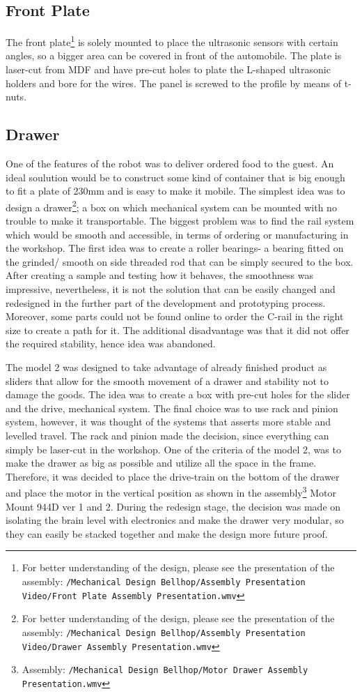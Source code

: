 \documentclass[11pt]{article}
\begin{document}
\subsection*{Front Plate}
The front plate\footnote{For better understanding of the design, please see the presentation of the assembly: \texttt{/Mechanical Design Bellhop/Assembly Presentation Video/Front Plate Assembly Presentation.wmv}} is solely mounted to place the ultrasonic sensors with certain angles, so a bigger area can be covered in front of the automobile. The plate is laser-cut from MDF and have pre-cut holes to plate the L-shaped ultrasonic holders and bore for the wires. The panel is screwed to the profile by means of t-nuts. 


\subsection*{Drawer}
One of the features of the robot was to deliver ordered food to the guest. An ideal soulution would be to construct some kind of container that is big enough to fit a plate of 230mm and is easy to make it mobile. The simplest idea was to design a drawer\footnote{For better understanding of the design, please see the presentation of the assembly: \texttt{/Mechanical Design Bellhop/Assembly Presentation Video/Drawer Assembly Presentation.wmv}}; a box on which mechanical system can be mounted with no trouble to make it transportable. The biggest problem was to find the rail system which would be smooth and accessible, in terms of ordering or manufacturing in the workshop. The first idea was to create a roller bearings- a bearing fitted on the grinded/ smooth on side threaded rod that can be simply secured to the box. After creating a sample and testing how it behaves, the smoothness was impressive, nevertheless, it is not the solution that can be easily changed and redesigned in the further part of the development and prototyping process. Moreover, some parts could not be found online to order the C-rail in the right size to create a path for it. The additional disadvantage was that it did not offer the required stability, hence idea was abandoned. 


The model 2 was designed to take advantage of already finished product as sliders that allow for the smooth movement of a drawer and stability not to damage the goods. The idea was to create a box with pre-cut holes for the slider and the drive, mechanical system. The final choice was to use rack and pinion system, however, it was thought of the systems that asserts more stable and levelled travel. The rack and pinion made the decision, since everything can simply be laser-cut in the workshop. One of the criteria of the model 2, was to make the drawer as big as possible and utilize all the space in the frame. Therefore, it was decided to place the drive-train on the bottom of the drawer and place the motor in the vertical position as shown in the assembly\footnote{Assembly: \texttt{/Mechanical Design Bellhop/Motor Drawer Assembly Presentation.wmv}} Motor Mount 944D ver 1 and 2. During the redesign stage, the decision was made on isolating the brain level with electronics and make the drawer very modular, so they can easily be stacked together and make the design more future proof.
\end{document}
